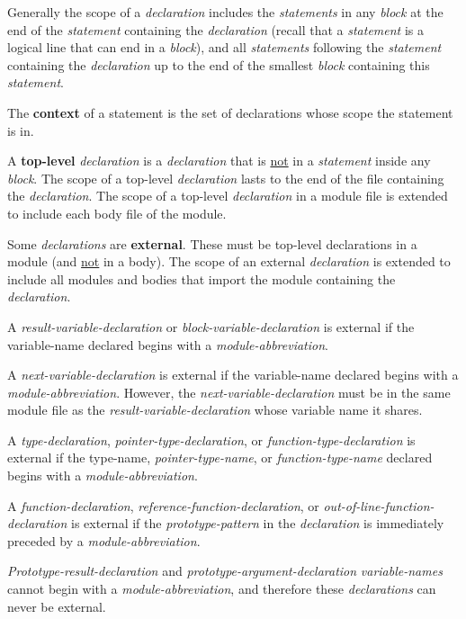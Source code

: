 \documentclass[12pt]{article}
\newcommand{\key}[1]{{\rm \bfseries #1}}
\begin{document}
Generally the scope of a {\em declaration} includes the {\em statements}
in any {\em block} at the end of the {\em statement}
containing the {\em declaration} (recall that a {\em statement} is a
logical line that can end in a {\em block}), and
all {\em statements} following the {\em statement} containing
the {\em declaration} up to the end of the smallest {\em block}
containing this {\em statement}.

The \key{context}\label{CONTEXT} of a statement is the set of declarations
whose scope the statement is in.

A \key{top-level} {\em declaration} is a {\em declaration} that is
\underline{not} in a {\em statement} inside any {\em block}.
The scope of a top-level {\em declaration} lasts to the end of the
file containing the {\em declaration}.
The scope of a top-level {\em declaration} in a module file is extended
to include each body file of the module.

Some {\em declarations} are \key{external}\label{EXTERNAL}.
These must be top-level declarations in a module (and \underline{not}
in a body).
The scope of an external
{\em declaration} is extended to include all modules and bodies that
import the module containing the {\em declaration}.

A {\em result-variable-declaration} or
{\em block-variable-declaration}
is external if the {variable-name} declared begins with a
{\em module-abbreviation}.

A {\em next-variable-declaration}
is external if the {variable-name} declared begins with a
{\em module-abbreviation}.  However, the {\em next-variable-declaration}
must be in the same module file as the {\em result-variable-declaration}
whose variable name it shares.

A {\em type-declaration}, {\em pointer-type-declaration}, or
{\em function-type-declaration}
\label{EXTERNAL-TYPE-NAME}
is external if the {type-name}, {\em pointer-type-name},
or {\em function-type-name}
declared begins with a
{\em module-abbrev\-i\-a\-tion}.

A {\em function-declaration}, {\em reference-function-declaration},
or {\em out-of-line-function-declar\-a\-tion}
is external\label{EXTERNAL-FUNCTION}
if the {\em prototype-pattern} in the {\em declaration}
is immediately preceded by a {\em module-abbreviation}.

{\em Prototype-result-declaration} and {\em prototype-argument-declaration}
{\em variable-names} cannot begin with a {\em module-abbreviation},
and therefore these {\em declarations} can never be external.
\end{document}
